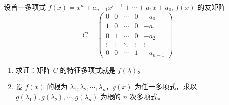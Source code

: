 \documentclass[lang=cn,newtx,10pt,scheme=chinese]{elegantbook}
\begin{document}
\begin{proposition}[友矩阵的特征多项式及特征值]\label{proposition:多项式的友阵的特征多项式与特征值}
设首一多项式 $f(x) = x^n + a_{n-1} x^{n-1} + \cdots + a_1 x + a_0$, $f(x)$ 的友矩阵
\[
C = \begin{pmatrix}
0 & 0 & \cdots & 0 & -a_0 \\
1 & 0 & \cdots & 0 & -a_1 \\
0 & 1 & \cdots & 0 & -a_2 \\
\vdots & \vdots & \ddots & \vdots & \vdots \\
0 & 0 & \cdots & 1 & -a_{n-1}
\end{pmatrix}.
\]
\begin{enumerate}[(1)]
\item 求证：矩阵 $C$ 的特征多项式就是 $f(\lambda)$。

\item 设 $f(x)$ 的根为 $\lambda_1, \lambda_2, \cdots, \lambda_n$，$g(x)$ 为任一多项式，求以 $g(\lambda_1), g(\lambda_2), \cdots, g(\lambda_n)$ 为根的 $n$ 次多项式。 
\end{enumerate}
\end{proposition}
\end{document}
